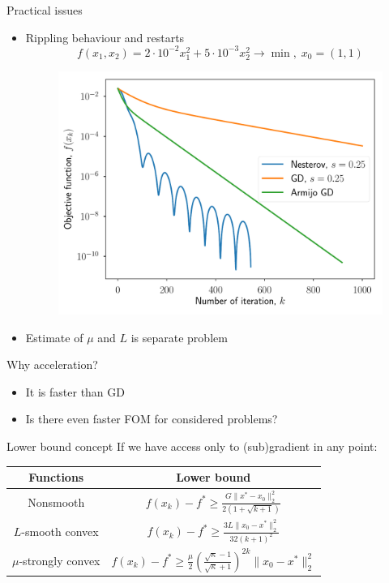 \documentclass{beamer}
\begin{document}
\begin{frame}{Practical issues}
\begin{itemize}
\item Rippling behaviour and restarts
\[
f(x_1, x_2) = 2 \cdot 10^{-2}x_1^2 + 5 \cdot 10^{-3}x^2_2 \to \min, \; x_0 = (1, 1)
\]
\begin{figure}
\centering
\includegraphics[scale=0.4]{nesterov_gd}
\end{figure}
\item Estimate of $\mu$ and $L$ is separate problem
\end{itemize}
\end{frame}

\begin{frame}{Why acceleration?}
\begin{itemize}
\item It is faster than GD
\item Is there even faster FOM for considered problems?
\end{itemize}
\end{frame}

\begin{frame}{Lower bound concept}
If we have access only to (sub)gradient in any point:
 
\begin{table}
\centering
\begin{tabular}{|c|c|}
\hline
Functions & Lower bound\\
\hline
Nonsmooth & $f(x_k) - f^* \geq \frac{G\|x^* - x_0\|_2^2}{2(1 + \sqrt{k+1})}$\\
\hline
$L$-smooth convex & $f(x_k) - f^* \geq \frac{3L \|x_0 - x^*\|_2^2}{32(k+1)^2}$\\
\hline
$\mu$-strongly convex & $f(x_k) - f^* \geq \frac{\mu}{2}\left(\frac{\sqrt{\kappa} - 1}{\sqrt{\kappa} + 1} \right)^{2k} \|x_0 - x^*\|_2^2$\\
\hline
\end{tabular}
\end{table}
\end{frame}
\end{document}
